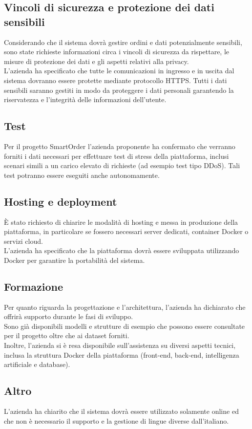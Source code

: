\subsection{Vincoli di sicurezza e protezione dei dati sensibili}
Considerando che il sistema dovrà gestire ordini e dati potenzialmente sensibili, sono state richieste informazioni circa i vincoli di sicurezza da rispettare, le misure di protezione dei dati e gli aspetti relativi alla privacy.\\
L'azienda ha specificato che tutte le comunicazioni in ingresso e in uscita dal sistema dovranno essere protette mediante protocollo HTTPS. Tutti i dati sensibili saranno gestiti in modo da proteggere i dati personali garantendo la riservatezza e l'integrità delle informazioni dell'utente.

\subsection{Test}
Per il progetto SmartOrder l'azienda proponente ha confermato che verranno forniti i dati necessari per effettuare test di stress della piattaforma, inclusi scenari simili a un carico elevato di richieste (ad esempio test tipo DDoS).
Tali test potranno essere eseguiti anche autonomamente.

\subsection{Hosting e deployment}
È stato richiesto di chiarire le modalità di hosting e messa in produzione della piattaforma, in particolare se fossero necessari server dedicati, container Docker o servizi cloud.\\
L'azienda ha specificato che la piattaforma dovrà essere sviluppata utilizzando Docker per garantire la portabilità del sistema. 

\subsection{Formazione}
Per quanto riguarda la progettazione e l’architettura, l’azienda ha dichiarato che offrirà supporto durante le fasi di sviluppo.\\
Sono già disponibili modelli e strutture di esempio che possono essere consultate per il progetto oltre che ai dataset forniti.\\
Inoltre, l'azienda si è resa disponibile sull'assistenza su diversi aspetti tecnici, inclusa la struttura Docker della piattaforma (front-end, back-end, intelligenza artificiale e database).

\subsection{Altro}
L'azienda ha chiarito che il sistema dovrà essere utilizzato solamente online ed che non è necessario il supporto e la gestione di lingue diverse dall'italiano.
